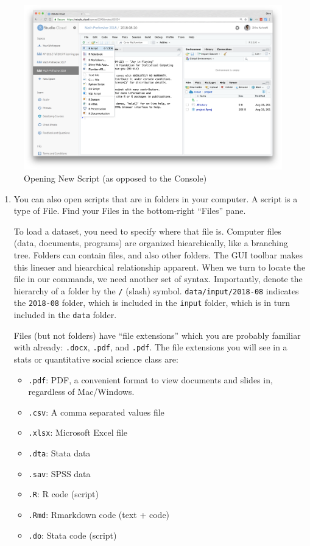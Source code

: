 \documentclass[]{book}
\theoremstyle{definition}
\theoremstyle{definition}
\theoremstyle{definition}
\theoremstyle{remark}
\begin{document}
\begin{figure}
\centering
\includegraphics{images/11_2_rstudio-script.png}
\caption{Opening New Script (as opposed to the Console)}
\end{figure}

\begin{enumerate}
\def\labelenumi{\arabic{enumi}.}
\setcounter{enumi}{3}
\item
  You can also open scripts that are in folders in your computer. A script is a type of File. Find your Files in the bottom-right ``Files'' pane.

  To load a dataset, you need to specify where that file is. Computer files (data, documents, programs) are organized hiearchically, like a branching tree. Folders can contain files, and also other folders. The GUI toolbar makes this lineaer and hiearchical relationship apparent. When we turn to locate the file in our commands, we need another set of syntax. Importantly, denote the hierarchy of a folder by the \texttt{/} (slash) symbol. \texttt{data/input/2018-08} indicates the \texttt{2018-08} folder, which is included in the \texttt{input} folder, which is in turn included in the \texttt{data} folder.

  Files (but not folders) have ``file extensions'' which you are probably familiar with already: \texttt{.docx}, \texttt{.pdf}, and \texttt{.pdf}. The file extensions you will see in a stats or quantitative social science class are:

  \begin{itemize}
  \item
    \texttt{.pdf}: PDF, a convenient format to view documents and slides in, regardless of Mac/Windows.
  \item
    \texttt{.csv}: A comma separated values file
  \item
    \texttt{.xlsx}: Microsoft Excel file
  \item
    \texttt{.dta}: Stata data
  \item
    \texttt{.sav}: SPSS data
  \item
    \texttt{.R}: R code (script)
  \item
    \texttt{.Rmd}: Rmarkdown code (text + code)
  \item
    \texttt{.do}: Stata code (script)
  \end{itemize}
\end{enumerate}
\end{document}
